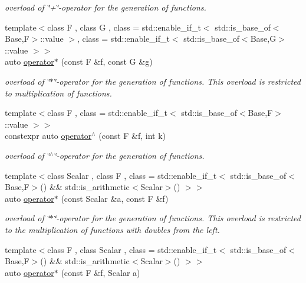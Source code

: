 \begin{DoxyCompactItemize}
\begin{DoxyCompactList}\small\item\em overload of \char`\"{}+\char`\"{}-\/operator for the generation of functions. \end{DoxyCompactList}\item 
{\footnotesize template$<$class F , class G , class  = std\-::enable\-\_\-if\-\_\-t$<$ std\-::is\-\_\-base\-\_\-of$<$\-Base,\-F$>$\-::value $>$, class  = std\-::enable\-\_\-if\-\_\-t$<$ std\-::is\-\_\-base\-\_\-of$<$\-Base,\-G$>$\-::value $>$$>$ }\\auto \hyperlink{namespaceRFFGen_a62822aff0618fe8e869c7f73c82454df}{operator$\ast$} (const F \&f, const G \&g)
\begin{DoxyCompactList}\small\item\em overload of \char`\"{}$\ast$\char`\"{}-\/operator for the generation of functions. This overload is restricted to multiplication of functions. \end{DoxyCompactList}\item 
{\footnotesize template$<$class F , class  = std\-::enable\-\_\-if\-\_\-t$<$ std\-::is\-\_\-base\-\_\-of$<$\-Base,\-F$>$\-::value $>$$>$ }\\constexpr auto \hyperlink{namespaceRFFGen_ab2e1b87874474c32b20338fc3c60be5a}{operator$^\wedge$} (const F \&f, int k)
\begin{DoxyCompactList}\small\item\em overload of \char`\"{}$^\wedge$\char`\"{}-\/operator for the generation of functions. \end{DoxyCompactList}\item 
{\footnotesize template$<$class Scalar , class F , class  = std\-::enable\-\_\-if\-\_\-t$<$ std\-::is\-\_\-base\-\_\-of$<$\-Base,\-F$>$() \&\& std\-::is\-\_\-arithmetic$<$\-Scalar$>$() $>$$>$ }\\auto \hyperlink{namespaceRFFGen_a7be854ac2257ddf852ddb3ac6cfc413d}{operator$\ast$} (const Scalar \&a, const F \&f)
\begin{DoxyCompactList}\small\item\em overload of \char`\"{}$\ast$\char`\"{}-\/operator for the generation of functions. This overload is restricted to the multiplication of functions with doubles from the left. \end{DoxyCompactList}\item 
{\footnotesize template$<$class F , class Scalar , class  = std\-::enable\-\_\-if\-\_\-t$<$ std\-::is\-\_\-base\-\_\-of$<$\-Base,\-F$>$() \&\& std\-::is\-\_\-arithmetic$<$\-Scalar$>$() $>$$>$ }\\auto \hyperlink{namespaceRFFGen_a6e94e177aaa2786b8d504273a402b41e}{operator$\ast$} (const F \&f, Scalar a)

\end{DoxyCompactItemize}
